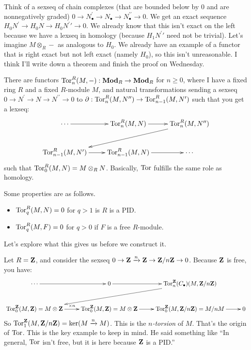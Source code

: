 Think of a sexseq of chain complexes (that are bounded below by $0$ and are nonnegatively graded) $0\to N^\prime_\bullet\to N_\bullet\to N^{\prime\prime}_\bullet\to 0$. We get an exact sequence $ H_0 N^\prime\to H_0 N\to H_0 N^\prime\prime\to 0$. We already know that this isn't exact on the left because we have a lexseq in homology (because $ H_1 N^\prime\prime$ need not be trivial). Let's imagine $M\otimes_R-$ as analogous to $ H_0$. We already have an example of a functor that is right exact but not left exact (namely $ H_0$), so this isn't unreasonable. I think I'll write down a theorem and finish the proof on Wednesday.
\begin{theorem}
There are functors $\operatorname{Tor}^R_n(M,-):\mathbf{Mod}_R\to\mathbf{Mod}_R$ for $n\geq 0$, where I have a fixed ring $R$ and a fixed $R$-module $M$, and natural transformations sending a sexseq $0\to N^\prime\to N\to N^{\prime\prime}\to 0$ to $\partial:\operatorname{Tor}^R_n(M,N^{\prime\prime})\to \operatorname{Tor}^R_{n-1}(M,N^\prime)$ such that you get a lexseq:
\begin{equation*}
\xymatrix{\cdots\ar[r] & \Tor^R_n(M,N)\ar[r] & \Tor^R_n(M,N^{\prime\prime})\ar[dll]\\
\Tor^R_{n-1}(M,N^\prime)\ar[r] & \Tor^R_{n-1}(M,N)\ar[r] & \cdots}
\end{equation*}
such that $\operatorname{Tor}^R_0(M,N)=M\otimes_R N$. Basically, $\operatorname{Tor}$ fulfills the same role as homology.
\end{theorem}
Some properties are as follows.
\begin{itemize}
\item $\operatorname{Tor}^R_q(M,N)=0$ for $q>1$ is $R$ is a PID.
\item $\operatorname{Tor}^R_q(M,F)=0$ for $q>0$ if $F$ is a free $R$-module.
\end{itemize}
Let's explore what this gives us before we construct it.
\begin{example}
Let $R=\mathbf Z$, and consider the sexseq $0\to \mathbf Z\xrightarrow{n}\mathbf Z\to\mathbf Z/n\mathbf Z\to 0$. Because $\mathbf Z$ is free, you have:
\begin{equation*}
\xymatrix{\cdots\ar[r] & 0\ar[r] & \Tor^\Z_n(C_\bullet)(M,\Z/n\Z)\ar[dll]\\
\Tor^\Z_{0}(M,\Z)=M\otimes\Z\ar[r]^{\times n} & \Tor^\Z_{0}(M,\Z)=M\otimes\Z\ar[r] & \Tor^\Z_0(M,\Z/n\Z)=M/nM\ar[r] & 0}
\end{equation*}
So $\operatorname{Tor}^\mathbf Z_1(M,\mathbf Z/n\mathbf Z)=\ker(M\xrightarrow{n}M)$. This is the \emph{$n$-torsion} of $M$. That's the origin of $\operatorname{Tor}$. This is the key example to keep in mind. He said something like ``In general, $\operatorname{Tor}$ isn't free, but it is here because $\mathbf Z$ is a PID.''
\end{example}
